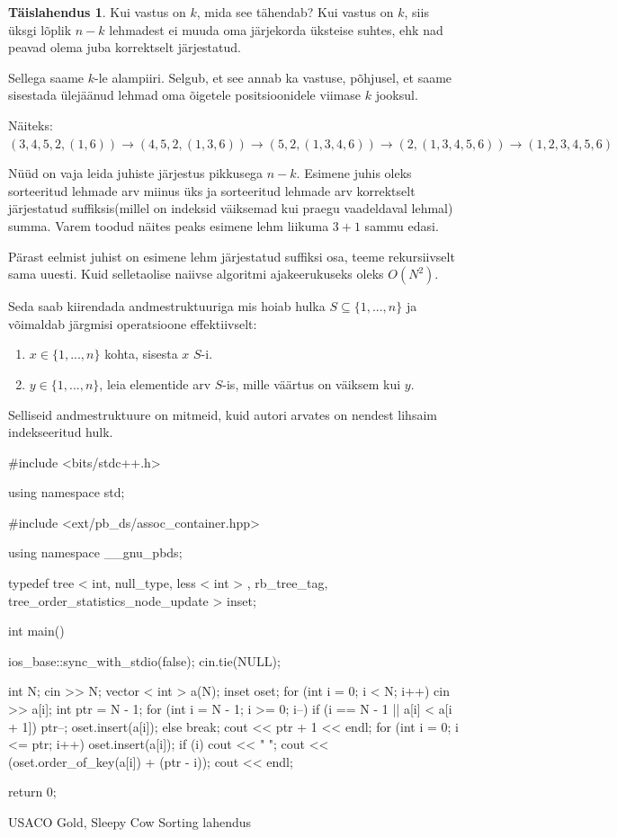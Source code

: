 \documentclass{trkut}
\theoremstyle{definition}
\newtheorem*{solution}{Täislahendus}
\begin{document}
\begin{solution}
Kui vastus on $k$, mida see tähendab? Kui vastus on $k$, siis üksgi lõplik $n-k$ lehmadest ei muuda oma järjekorda üksteise suhtes, ehk nad peavad olema juba korrektselt järjestatud.

Sellega saame $k$-le alampiiri. Selgub, et see annab ka vastuse, põhjusel, et saame sisestada ülejäänud lehmad oma õigetele positsioonidele viimase $k$ jooksul. 

Näiteks: $(3,4,5,2,(1,6))→(4,5,2,(1,3,6))→(5,2,(1,3,4,6))→(2,(1,3,4,5,6))→(1,2,3,4,5,6)$

Nüüd on vaja leida juhiste järjestus pikkusega $n-k$.  Esimene juhis oleks sorteeritud lehmade arv miinus üks ja sorteeritud lehmade arv korrektselt järjestatud suffiksis(millel on indeksid väiksemad kui praegu vaadeldaval lehmal) summa.  Varem toodud näites peaks esimene lehm liikuma $3+1$ sammu edasi.

Pärast eelmist juhist on esimene lehm järjestatud suffiksi osa, teeme rekursiivselt sama uuesti. Kuid selletaolise naiivse algoritmi ajakeerukuseks oleks $O(N^2)$.

Seda saab kiirendada andmestruktuuriga mis hoiab hulka $S\subseteq \{1,...,n\}$ ja võimaldab järgmisi operatsioone effektiivselt: 
\begin{enumerate}
    \item $x\in \{1,...,n\}$ kohta, sisesta $x$ $S$-i.
    \item $y\in \{1,...,n\}$, leia elementide arv $S$-is, mille väärtus on väiksem kui $y$.
\end{enumerate}

Selliseid andmestruktuure on mitmeid, kuid autori arvates on nendest lihsaim indekseeritud hulk.
\end{solution}
\begin{cclol}
#include <bits/stdc++.h>

using namespace std;

#include <ext/pb_ds/assoc_container.hpp>

using namespace __gnu_pbds;

typedef tree < int, null_type, less < int > , 
rb_tree_tag, tree_order_statistics_node_update > inset;

int main() {
  ios_base::sync_with_stdio(false);
  cin.tie(NULL);

  int N;
  cin >> N;
  vector < int > a(N);
  inset oset;
  for (int i = 0; i < N; i++) cin >> a[i];
  int ptr = N - 1;
  for (int i = N - 1; i >= 0; i--) {
    if (i == N - 1 || a[i] < a[i + 1]) {
      ptr--;
      oset.insert(a[i]);
    } else break;
  }
  cout << ptr + 1 << endl;
  for (int i = 0; i <= ptr; i++) {
    oset.insert(a[i]);
    if (i) cout << " ";
    cout << (oset.order_of_key(a[i]) + (ptr - i));
  }
  cout << endl;

  return 0;
}
\end{cclol}
\begin{kk}[H]
    \caption{USACO Gold, Sleepy Cow Sorting lahendus}%
    \end{kk}
\end{document}
